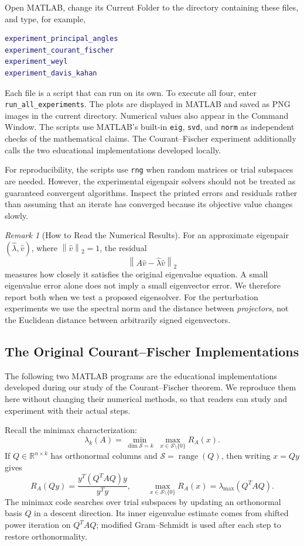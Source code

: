 \documentclass[14pt,letterpaper]{article}
\theoremstyle{plain}
\theoremstyle{definition}
\theoremstyle{remark}
\newtheorem{remark}[theorem]{Remark}
\newcommand{\R}{\mathbb{R}}
\newcommand{\norm}[1]{\left\lVert #1 \right\rVert}
\DeclareMathOperator{\range}{range}
\begin{document}
Open MATLAB, change its Current Folder to the directory
containing these files, and type, for example,
\begin{lstlisting}[language=Matlab]
experiment_principal_angles
experiment_courant_fischer
experiment_weyl
experiment_davis_kahan
\end{lstlisting}
Each file is a script that can run on its own. To execute
all four, enter \texttt{run\_all\_experiments}. The plots
are displayed in MATLAB and saved as PNG images in the
current directory. Numerical values also appear in the
Command Window. The scripts use MATLAB's built-in
\texttt{eig}, \texttt{svd}, and \texttt{norm} as independent
checks of the mathematical claims. The Courant--Fischer
experiment additionally calls the two educational
implementations developed locally.

For reproducibility, the scripts use \texttt{rng} when
random matrices or trial subspaces are needed. However,
the experimental eigenpair solvers should not be treated
as guaranteed convergent algorithms. Inspect the printed
errors and residuals rather than assuming that an iterate
has converged because its objective value changes slowly.

\begin{remark}[How to Read the Numerical Results]
For an approximate eigenpair $(\widehat\lambda,\widehat v)$,
where $\norm{\widehat v}_2=1$, the residual
\[
\boxed{\norm{A\widehat v-\widehat\lambda\widehat v}_2}
\]
measures how closely it satisfies the original eigenvalue
equation. A small eigenvalue error alone does not imply
a small eigenvector error. We therefore report both when
we test a proposed eigensolver. For the perturbation
experiments we use the spectral norm and the distance
between \emph{projectors}, not the Euclidean distance
between arbitrarily signed eigenvectors.
\end{remark}

\subsection{The Original Courant--Fischer Implementations}
\label{subsec:matlab_cf_original}

The following two MATLAB programs are the educational
implementations developed during our study of the
Courant--Fischer theorem. We reproduce them here without
changing their numerical methods, so that readers can
study and experiment with their actual steps.

Recall the minimax characterization:
\[
\lambda_k(A)=
\min_{\dim\mathcal S=k}\;\max_{x\in\mathcal S\setminus\{0\}}R_A(x).
\]
If $Q\in\R^{n\times k}$ has orthonormal columns and
$\mathcal S=\range(Q)$, then writing $x=Qy$ gives
\[
R_A(Qy)=\frac{y^T(Q^TAQ)y}{y^Ty},
\qquad
\max_{x\in\mathcal S\setminus\{0\}}R_A(x)
=\lambda_{\max}(Q^TAQ).
\]
The minimax code searches over trial subspaces by
updating an orthonormal basis $Q$ in a descent direction.
Its inner eigenvalue estimate comes from shifted power
iteration on $Q^TAQ$; modified Gram--Schmidt is used
after each step to restore orthonormality.
\end{document}
